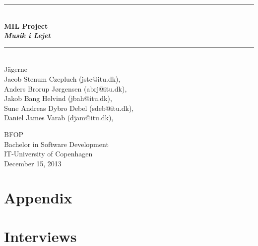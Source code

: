 \documentclass[a4paper,11pt]{article}
\begin{document}
\begin{titlepage}
\centering \parindent=0pt
\newcommand{\HRule}{\rule{\textwidth}{1mm}}
 \HRule\\[1cm]\Huge\bfseries
MIL Project\\\emph{Musik i Lejet}\\[0.7cm]
\HRule\\[4cm]  \large  Jägerne
\\Jacob Stenum Czepluch (jstc@itu.dk), \\
Anders Brorup Jørgensen (abrj@itu.dk), \\
Jakob Bang Helvind (jbah@itu.dk), \\
Sune Andreas Dybro Debel (sdeb@itu.dk), \\
Daniel James Varab (djam@itu.dk), \\

 \normalsize %
\thispagestyle{empty}
\begin{flushleft}
BFOP \\
Bachelor in Software Development\\


IT-University of Copenhagen\\
December 15, 2013 \end{flushleft}
\end{titlepage}
\tableofcontents
\pagebreak
\pagebreak
{}
\setcounter{page}{1}





\appendix
\part{Appendix}








\part{Interviews}





%
\end{document}
